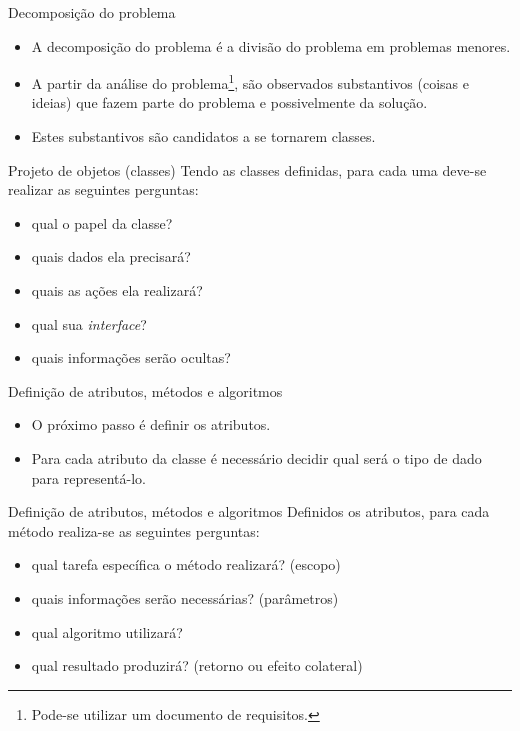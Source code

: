 \documentclass[11pt,justified]{beamer}
\begin{document}
\begin{frame}{Decomposição do problema}
    \begin{itemize}
        \item A decomposição do problema é a divisão do problema em problemas menores.
        \item A partir da análise do problema\footnote{Pode-se utilizar um documento de requisitos.}, são observados substantivos (coisas e ideias) que fazem parte do problema e possivelmente da solução.
        \item Estes substantivos são candidatos a se tornarem classes.
    \end{itemize}
\end{frame}

\begin{frame}{Projeto de objetos (classes)}
    Tendo as classes definidas, para cada uma deve-se realizar as seguintes perguntas:
    \begin{itemize}
        \item qual o papel da classe?
        \item quais dados ela precisará?
        \item quais as ações ela realizará?
        \item qual sua \textit{interface}?
        \item quais informações serão ocultas?
    \end{itemize}
\end{frame}

\begin{frame}{Definição de atributos, métodos e algoritmos}
    \begin{itemize}
        \item O próximo passo é definir os atributos.
        \item Para cada atributo da classe é necessário decidir qual será o tipo de dado para representá-lo.
    \end{itemize}
\end{frame}

\begin{frame}{Definição de atributos, métodos e algoritmos}
    Definidos os atributos, para cada método realiza-se as seguintes perguntas:
    \begin{itemize}
        \item qual tarefa específica o método realizará? (escopo)
        \item quais informações serão necessárias? (parâmetros)
        \item qual algoritmo utilizará?
        \item qual resultado produzirá? (retorno ou efeito colateral)
    \end{itemize}
\end{frame}
\end{document}
